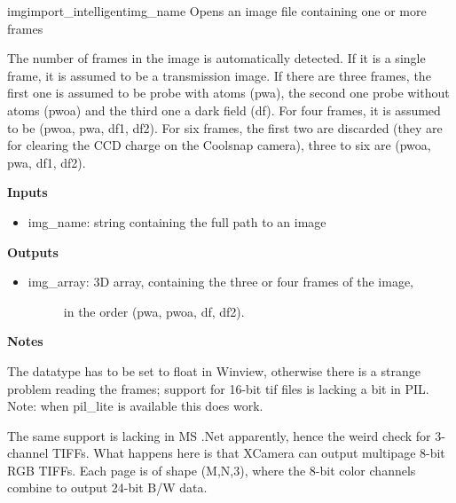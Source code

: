 \documentclass[letterpaper,10pt,english]{manual}
\begin{document}
\hypertarget{odysseus.imageio.imgimport_intelligent}{}\begin{funcdesc}{imgimport\_intelligent}{img\_name}
Opens an image file containing one or more frames

The number of frames in the image is automatically detected. If it is a
single frame, it is assumed to be a transmission image. If there are three
frames, the first one is assumed to be probe with atoms (pwa), the second
one probe without atoms (pwoa) and the third one a dark field (df).
For four frames, it is assumed to be (pwoa, pwa, df1, df2).
For six frames, the first two are discarded (they are for clearing the
CCD charge on the Coolsnap camera), three to six are (pwoa, pwa, df1, df2).

\textbf{Inputs}
\begin{itemize}
\item {} 
img\_name: string containing the full path to an image

\end{itemize}

\textbf{Outputs}
\begin{itemize}
\item {} \begin{description}
\item[img\_array: 3D array, containing the three or four frames of the image,] \leavevmode
in the  order (pwa, pwoa, df, df2).

\end{description}

\end{itemize}

\textbf{Notes}

The datatype has to be set to float in Winview, otherwise there is a
strange problem reading the frames; support for 16-bit tif files is
lacking a bit in PIL. Note: when pil\_lite is available this does work.

The same support is lacking in MS .Net apparently, hence the weird check
for 3-channel TIFFs. What happens here is that XCamera can output multipage
8-bit RGB TIFFs. Each page is of shape (M,N,3), where the 8-bit color
channels combine to output 24-bit B/W data.
\end{funcdesc}
\end{document}
